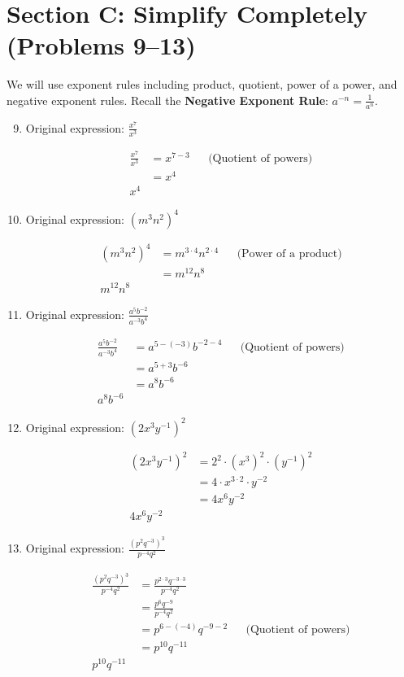 \documentclass{article}
\begin{document}
\section*{Section C: Simplify Completely (Problems 9--13)} 
We will use exponent rules including product, quotient, power of a power, and negative exponent rules. Recall the \textbf{Negative Exponent Rule}: $a^{-n} = \frac{1}{a^n}$.

\begin{enumerate}
\setcounter{enumi}{8}

\item
Original expression: \quad $\frac{x^7}{x^3}$

\begin{align*}
\frac{x^7}{x^3} &= x^{7-3} && \text{(Quotient of powers)} \\
&= x^4 \\
\boxed{x^4}
\end{align*}

\item
Original expression: \quad $(m^3 n^2)^4$

\begin{align*}
(m^3 n^2)^4 &= m^{3 \cdot 4} n^{2 \cdot 4} && \text{(Power of a product)} \\
&= m^{12} n^{8} \\
\boxed{m^{12} n^{8}}
\end{align*}

\item
Original expression: \quad $\frac{a^5 b^{-2}}{a^{-3} b^4}$

\begin{align*}
\frac{a^5 b^{-2}}{a^{-3} b^4} &= a^{5 - (-3)} b^{-2 - 4} && \text{(Quotient of powers)} \\
&= a^{5 + 3} b^{-6} \\
&= a^{8} b^{-6} \\
\boxed{a^{8} b^{-6}}
\end{align*}

\item
Original expression: \quad $(2x^3 y^{-1})^2$

\begin{align*}
(2x^3 y^{-1})^2 &= 2^2 \cdot (x^3)^2 \cdot (y^{-1})^2 \\
&= 4 \cdot x^{3 \cdot 2} \cdot y^{-2} \\
&= 4 x^{6} y^{-2} \\
\boxed{4 x^{6} y^{-2}}
\end{align*}

\item
Original expression: \quad $\frac{(p^2 q^{-3})^3}{p^{-4} q^2}$

\begin{align*}
\frac{(p^2 q^{-3})^3}{p^{-4} q^2} &= \frac{p^{2 \cdot 3} q^{-3 \cdot 3}}{p^{-4} q^2} \\
&= \frac{p^{6} q^{-9}}{p^{-4} q^{2}} \\
&= p^{6 - (-4)} q^{-9 - 2} && \text{(Quotient of powers)} \\
&= p^{10} q^{-11} \\
\boxed{p^{10} q^{-11}}
\end{align*}
\end{enumerate}
\end{document}
